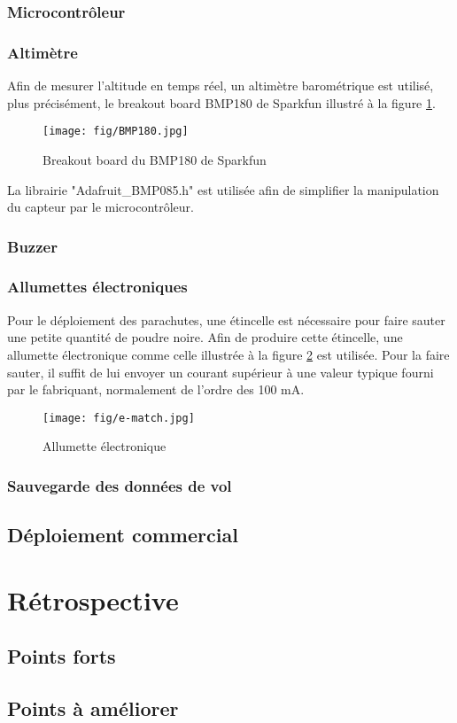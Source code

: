 \subsubsection{Microcontrôleur}



\subsubsection{Altimètre}

Afin de mesurer l'altitude en temps réel, un altimètre barométrique est
utilisé, plus précisément, le breakout board BMP180 de Sparkfun illustré à la
figure \ref{f:BMP180}.

\begin{figure}[H]
	\center
	\texttt{[image: fig/BMP180.jpg]}
	\caption{Breakout board du BMP180 de Sparkfun}
	\label{f:BMP180}
\end{figure}

La librairie "Adafruit\_BMP085.h" est utilisée afin de simplifier la
manipulation du capteur par le microcontrôleur.

\subsubsection{Buzzer}



\subsubsection{Allumettes électroniques}

Pour le déploiement des parachutes, une étincelle est nécessaire pour faire
sauter une petite quantité de poudre noire. Afin de produire cette étincelle,
une allumette électronique comme celle illustrée à la figure \ref{f:e-match} est
utilisée. Pour la faire sauter, il suffit de lui envoyer un courant supérieur
à une valeur typique fourni par le fabriquant, normalement de l'ordre des
100 mA.

\begin{figure}[H]
	\center
	\texttt{[image: fig/e-match.jpg]}
	\caption{Allumette électronique}
	\label{f:e-match}
\end{figure}

\subsubsection{Sauvegarde des données de vol}



\subsection{Déploiement commercial}



\section{Rétrospective}

\subsection{Points forts}



\subsection{Points à améliorer}
